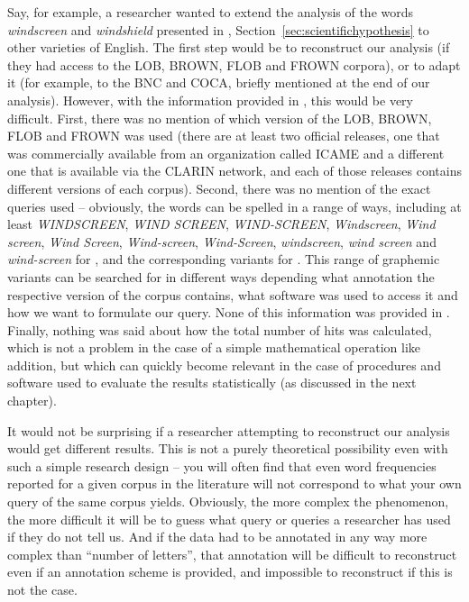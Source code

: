 Say, for example, a researcher wanted to extend the analysis of the words \textit{windscreen} and \textit{windshield} presented in , Section~\ref{sec:scientifichypothesis} to other varieties  of English. The first step would be to reconstruct our analysis (if they had access to the LOB,  BROWN,  FLOB  and FROWN  corpora), or to adapt it (for example, to the BNC  and COCA, briefly mentioned at the end of our analysis). However, with the information provided in , this would be very difficult. First, there was no mention of which version of the LOB,  BROWN,  FLOB  and FROWN  was used (there are at least two official releases, one that was commercially available from an organization called ICAME and a different one that is available via the CLARIN network, and each of those releases contains different versions of each corpus). Second, there was no mention of the exact queries  used -- obviously, the words can be spelled in a range of ways, including at least \textit{WINDSCREEN}, \textit{WIND SCREEN}, \textit{WIND-SCREEN}, \textit{Windscreen}, \textit{Wind screen}, \textit{Wind Screen}, \textit{Wind-screen}, \textit{Wind-Screen}, \textit{windscreen}, \textit{wind screen} and \textit{wind-screen} for , and the corresponding variants for . This range of graphemic variants can be searched for in different ways depending what annotation  the respective version of the corpus contains, what software was used to access it and how we want to formulate our query.  None of this information was provided in . Finally, nothing was said about how the total number of hits  was calculated, which is not a problem in the case of a simple mathematical operation like addition, but which can quickly become relevant in the case of procedures and software used to evaluate the results statistically (as discussed in the next chapter).

It would not be surprising if a researcher attempting to reconstruct our analysis would get different results. This is not a purely theoretical possibility even with such a simple research design  -- you will often find that even word frequencies  reported for a given corpus in the literature will not correspond to what your own query  of the same corpus yields. Obviously, the more complex  the phenomenon, the more difficult it will be to guess what query or queries a researcher has used if they do not tell us. And if the data had to be annotated  in any way more complex than ``number of letters'', that annotation will be difficult to reconstruct even if an annotation  scheme is provided, and impossible to reconstruct if this is not the case.


